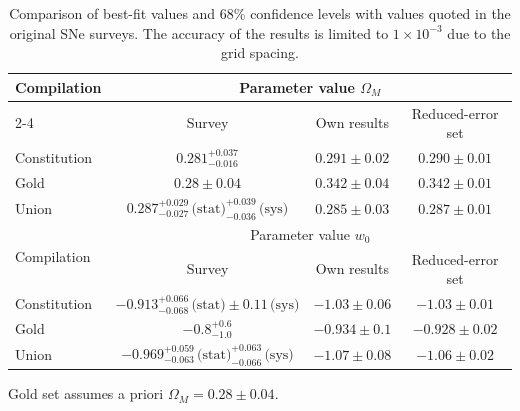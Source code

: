 \begin{table}[htbp]
\centering

\begin{threeparttable}

\caption{
Comparison of best-fit values and 68\% confidence levels with values
quoted in the original SNe surveys. The accuracy of the results is
limited to $1\times10^{-3}$ due to the grid spacing.
}
\label{tab:5.2}

\begin{tabular}{@{}lccc@{}}

\toprule

\multirow{2}{*}{Compilation}
&
\multicolumn{3}{c}{Parameter value $\Omega_M$}
\\

\cmidrule(lr){2-4}

&
Survey
&
Own results
&
Reduced-error set
\\

\midrule

Constitution &
$0.281^{+0.037}_{-0.016}$ &
$0.291 \pm 0.02$ &
$0.290 \pm 0.01$
\\

Gold\tnote{a} &
$0.28 \pm 0.04$ &
$0.342 \pm 0.04$ &
$0.342 \pm 0.01$
\\

Union &
$0.287^{+0.029}_{-0.027}\,\text{(stat)}
^{+0.039}_{-0.036}\,\text{(sys)}$ &
$0.285 \pm 0.03$ &
$0.287 \pm 0.01$
\\

\midrule

\multirow{2}{*}{Compilation}
&
\multicolumn{3}{c}{Parameter value $w_0$}
\\

\cmidrule(lr){2-4}

&
Survey
&
Own results
&
Reduced-error set
\\

\midrule

Constitution &
$-0.913^{+0.066}_{-0.068}\,\text{(stat)}
\pm 0.11\,\text{(sys)}$ &
$-1.03 \pm 0.06$ &
$-1.03 \pm 0.01$
\\

Gold &
$-0.8^{+0.6}_{-1.0}$ &
$-0.934 \pm 0.1$ &
$-0.928 \pm 0.02$
\\

Union &
$-0.969^{+0.059}_{-0.063}\,\text{(stat)}
^{+0.063}_{-0.066}\,\text{(sys)}$ &
$-1.07 \pm 0.08$ &
$-1.06 \pm 0.02$
\\

\bottomrule

\end{tabular}

\begin{tablenotes}
\footnotesize
\item[a] Gold set assumes a priori $\Omega_M = 0.28 \pm 0.04$.
\end{tablenotes}

\end{threeparttable}

\end{table}

